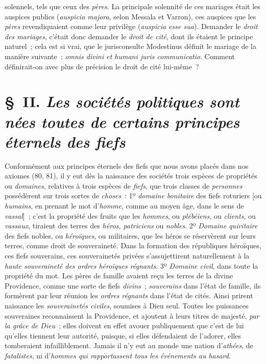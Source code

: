 \documentclass[french,twoside]{book} %
\begin{document}
solennels, tels que ceux des {\itshape pères}. La principale solennité de ces mariages était les auspices publics (\emph{{\itshape auspicia majora}}, selon Messala et Varron), ces auspices que les {\itshape pères} revendiquaient comme leur privilège ({\itshape auspicia esse sua}). Demander le {\itshape droit des mariages}, c’était donc demander le {\itshape droit de cité}, dont ils étaient le principe naturel ; cela est si vrai, que le jurisconsulte Modestinus définit le mariage de la manière suivante : \emph{{\itshape omnis divini et humani juris communicatio}}. Comment définirait-on avec plus de précision le droit de cité lui-même ?
\section[{§ II. Les sociétés politiques sont nées toutes de certains principes éternels des fiefs}]{§ II. {\itshape Les sociétés politiques sont nées toutes de certains principes éternels des fiefs}}
\noindent Conformément aux principes éternels des fiefs que nous avons placés dans nos axiomes (80, 81), il y eut dès la naissance des sociétés trois espèces de propriétés ou {\itshape domaines}, relatives à trois espèces de {\itshape fiefs}, que trois classes de {\itshape personnes} possédèrent sur trois sortes de {\itshape choses} : 1º {\itshape domaine bonitaire} des fiefs  roturiers [ou {\itshape humains}, en prenant le mot d’{\itshape homme}, comme au moyen âge, dans le sens de {\itshape vassal}] ; c’est la propriété des fruits que les {\itshape hommes}, ou {\itshape plébéiens}, ou {\itshape clients}, ou {\itshape vassaux}, tiraient des terres des {\itshape héros, patriciens} ou {\itshape nobles}. 2º {\itshape Domaine quiritaire} des fiefs nobles, ou {\itshape héroïques}, ou militaires, que les héros se réservèrent sur leurs terres, comme droit de souveraineté. Dans la formation des républiques héroïques, ces fiefs souverains, ces souverainetés privées s’assujettirent naturellement à la {\itshape haute souveraineté des ordres héroïques régnants}. 3º {\itshape Domaine civil}, dans toute la propriété du mot. Les pères de famille avaient reçu les terres de la divine Providence, comme une sorte de fiefs {\itshape divins} ; {\itshape souverains} dans l’état de famille, ils formèrent par leur réunion les {\itshape ordres régnants} dans l’état de cités. Ainsi prirent naissance les {\itshape souverainetés civiles}, soumises à Dieu seul. Toutes les puissances souveraines reconnaissent la Providence, et ajoutent à leurs titres de majesté, {\itshape par la grâce de Dieu} ; elles doivent en effet avouer publiquement que c’est de lui qu’elles tiennent leur autorité, puisque, si elles défendaient de l’adorer, elles tomberaient infailliblement. Jamais il n’y eut au monde une nation d’{\itshape athées}, de {\itshape fatalistes}, ni d’{\itshape hommes qui rapportassent tous les événements au hasard}.\par
\end{document}
